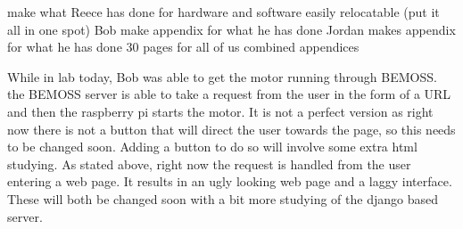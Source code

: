 \documentclass[fontsize=11pt, %
                             paper=letter, %
                             twoside, %
                             captions=tableheading,
                             index=totoc,
                             hyperref]{labbook}
\begin{document}
    
make what Reece has done for hardware and software easily relocatable (put it all in one spot) 
Bob make appendix for what he has done
Jordan makes appendix for what he has done 
30 pages for all of us combined 
appendices 

While in lab today, Bob was able to get the motor running through BEMOSS. the BEMOSS server is able to take a request from the user in the form of a URL and then the raspberry pi starts the motor. It is not a perfect version as right now there is not a button that will direct the user towards the page, so this needs to be changed soon. Adding a button to do so will involve some extra html studying. 
As stated above, right now the request is handled from the user entering a web page. It results in an ugly looking web page and a laggy interface. These will both be changed soon with a bit more studying of the django based server.





\end{document}

